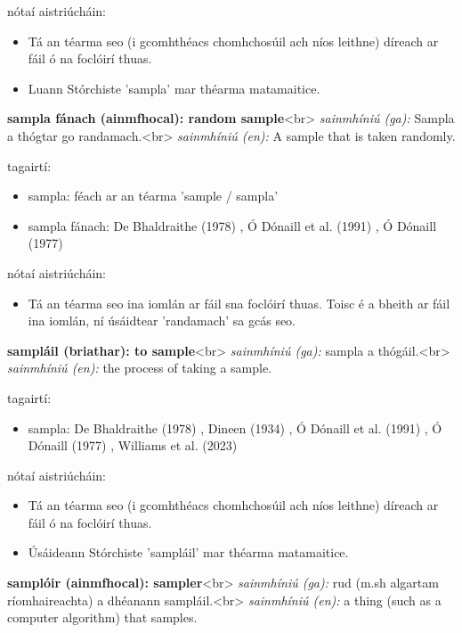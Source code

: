 \documentclass{article}
\begin{document}
nótaí aistriúcháin:
\begin{itemize}
	\item Tá an téarma seo (i gcomhthéacs chomhchosúil ach níos leithne) díreach ar fáil ó na foclóirí thuas.
	\item Luann Stórchiste 'sampla' mar théarma matamaitice.
\end{itemize}


\textbf{sampla fánach (ainmfhocal): random sample}<br>
\textit{sainmhíniú (ga):} Sampla a thógtar go randamach.<br>
\textit{sainmhíniú (en):} A sample that is taken randomly.

tagairtí:
\begin{itemize}
	\item sampla: féach ar an téarma 'sample / sampla'
	\item sampla fánach: De Bhaldraithe (1978) \cite{de-bhaldraithe}, Ó Dónaill et al. (1991) \cite{focloir-beag}, Ó Dónaill (1977) \cite{odonaill}
\end{itemize}

nótaí aistriúcháin:
\begin{itemize}
	\item Tá an téarma seo ina iomlán ar fáil sna foclóirí thuas. Toisc é a bheith ar fáil ina iomlán, ní úsáidtear 'randamach' sa gcás seo.
\end{itemize}


\textbf{sampláil (briathar): to sample}<br>
\textit{sainmhíniú (ga):} sampla a thógáil.<br>
\textit{sainmhíniú (en):} the process of taking a sample.

tagairtí:
\begin{itemize}
	\item sampla: De Bhaldraithe (1978) \cite{de-bhaldraithe}, Dineen (1934) \cite{dineen}, Ó Dónaill et al. (1991) \cite{focloir-beag}, Ó Dónaill (1977) \cite{odonaill}, Williams et al. (2023) \cite{storchiste}
\end{itemize}

nótaí aistriúcháin:
\begin{itemize}
	\item Tá an téarma seo (i gcomhthéacs chomhchosúil ach níos leithne) díreach ar fáil ó na foclóirí thuas.
	\item Úsáideann Stórchiste 'sampláil' mar théarma matamaitice.
\end{itemize}


\textbf{samplóir (ainmfhocal): sampler}<br>
\textit{sainmhíniú (ga):} rud (m.sh algartam ríomhaireachta) a dhéanann sampláil.<br>
\textit{sainmhíniú (en):} a thing (such as a computer algorithm) that samples.
\end{document}
